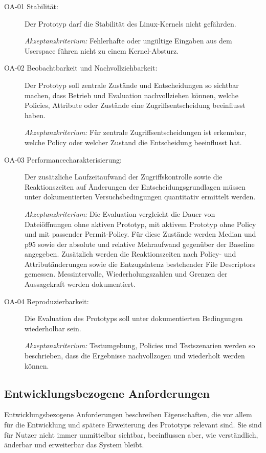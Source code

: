 \begin{description}
    \item[OA-01 Stabilität:]
    Der Prototyp darf die Stabilität des Linux-Kernels nicht gefährden.
    
    \textit{Akzeptanzkriterium:} Fehlerhafte oder ungültige Eingaben aus dem Userspace führen nicht zu einem Kernel-Absturz.

    \item[OA-02 Beobachtbarkeit und Nachvollziehbarkeit:]
    Der Prototyp soll zentrale Zustände und Entscheidungen so sichtbar machen, dass Betrieb und Evaluation nachvollziehen können, welche Policies, Attribute oder Zustände eine Zugriffsentscheidung beeinflusst haben.
    
    \textit{Akzeptanzkriterium:} Für zentrale Zugriffsentscheidungen ist erkennbar, welche Policy oder welcher Zustand die Entscheidung beeinflusst hat.

    \item[OA-03 Performancecharakterisierung:]
    Der zusätzliche Laufzeitaufwand der Zugriffskontrolle sowie die Reaktionszeiten auf Änderungen der Entscheidungsgrundlagen müssen unter dokumentierten Versuchsbedingungen quantitativ ermittelt werden.
    
    \textit{Akzeptanzkriterium:} Die Evaluation vergleicht die Dauer von Dateiöffnungen ohne aktiven Prototyp, mit aktivem Prototyp ohne Policy und mit passender Permit-Policy. Für diese Zustände werden Median und p95 sowie der absolute und relative Mehraufwand gegenüber der Baseline angegeben. Zusätzlich werden die Reaktionszeiten nach Policy- und Attributänderungen sowie die Entzugslatenz bestehender File Descriptors gemessen. Messintervalle, Wiederholungszahlen und Grenzen der Aussagekraft werden dokumentiert.

    \item[OA-04 Reproduzierbarkeit:]
    Die Evaluation des Prototyps soll unter dokumentierten Bedingungen wiederholbar sein.
    
    \textit{Akzeptanzkriterium:} Testumgebung, Policies und Testszenarien werden so beschrieben, dass die Ergebnisse nachvollzogen und wiederholt werden können.
\end{description}

\subsection{Entwicklungsbezogene Anforderungen}

Entwicklungsbezogene Anforderungen beschreiben Eigenschaften, die vor allem für die Entwicklung und spätere Erweiterung des Prototyps relevant sind. 
Sie sind für Nutzer nicht immer unmittelbar sichtbar, beeinflussen aber, wie verständlich, änderbar und erweiterbar das System bleibt.

